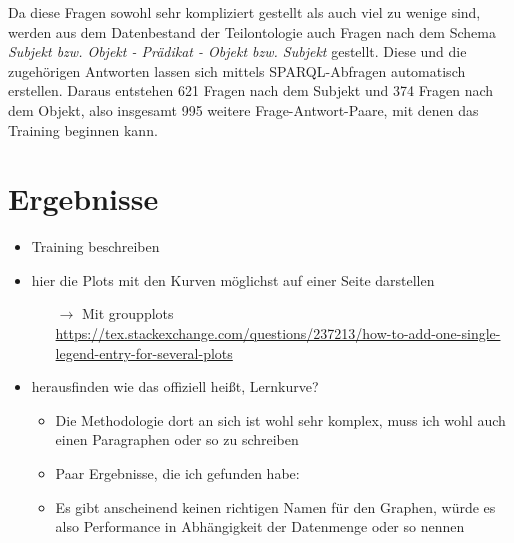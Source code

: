 \documentclass[utf8,biblatex]{lni}
\begin{document}
Da diese Fragen sowohl sehr kompliziert gestellt als auch viel zu wenige sind, werden aus dem Datenbestand der Teilontologie auch Fragen nach dem Schema \emph{Subjekt bzw. Objekt - Prädikat - Objekt bzw. Subjekt} gestellt.
Diese und die zugehörigen Antworten lassen sich mittels SPARQL-Abfragen automatisch erstellen.
Daraus entstehen 621 Fragen nach dem Subjekt und 374 Fragen nach dem Objekt, also insgesamt 995 weitere Frage-Antwort-Paare, mit denen das Training beginnen kann.

\section{Ergebnisse}

\begin{itemize}
  \item Training beschreiben
  \item hier die Plots mit den Kurven möglichst auf einer Seite darstellen
  \begin{itemize}
    \item[$\rightarrow$] Mit groupplots \url{https://tex.stackexchange.com/questions/237213/how-to-add-one-single-legend-entry-for-several-plots}
  \end{itemize}
  \item herausfinden wie das offiziell heißt, Lernkurve?
  \begin{itemize}
    \item Die Methodologie dort an sich ist wohl sehr komplex, muss ich wohl auch einen Paragraphen oder so zu schreiben
    \item Paar Ergebnisse, die ich gefunden habe:
    \item Es gibt anscheinend keinen richtigen Namen für den Graphen, würde es also Performance in Abhängigkeit der Datenmenge oder so nennen

\end{itemize}
\end{itemize}
\end{document}
